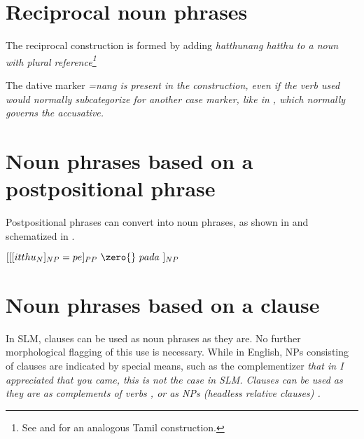 \section{Reciprocal noun phrases}\label{sec:nppp:Reciprocalnounphrases}
The reciprocal construction is formed by adding \em hatthunang hatthu \em to a noun with plural reference\footnote{See \citet[177]{Beythan1943} and \citet[11]{Malten1989} for an analogous Tamil construction.}


The dative marker \em =nang \em is   present in the construction, even if the verb used would normally subcategorize for another case marker, like  in , which normally governs the accusative.



\section{Noun phrases based on a postpositional phrase}\label{sec:nppp:Nounphrasesbasedonapostpositionalphrase}
Postpositional phrases can convert into noun phrases, as shown in  and schematized in .


\ea\label{ex:constr:NP:PP:schema}
$
[
	[
		[itthu_{N}]_{NP}
	=pe]_{PP}
~\zero{}~ pada~]_{NP}
$
\z


\section{Noun phrases based on a clause}\label{sec:nppp:Nounphrasesbasedonaclause}
In SLM, clauses can be used as noun phrases as they are. No further morphological flagging of this use is necessary. While in English, NPs consisting of clauses are indicated by special means, such as the complementizer \em that \em in \em I appreciated that you came\em, this is not the case in SLM. Clauses can be used as they are as complements of verbs   , or as NPs (headless relative clauses) .


